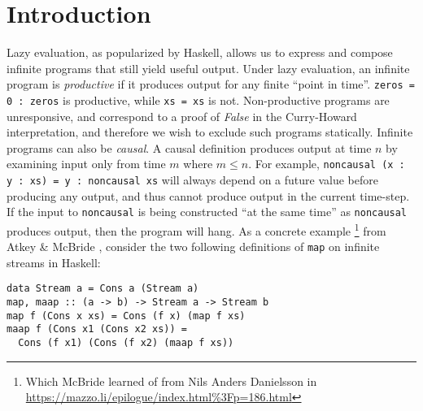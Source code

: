 \documentclass[sigplan,9pt,review]{acmart}\settopmatter{printfolios=true,printccs=false,printacmref=false}
\newcommand{\code}[1]{\texttt{#1}}
\begin{document}


\maketitle


\section{Introduction}
Lazy evaluation, as popularized by Haskell, allows us to express and
compose infinite programs that still yield useful output. Under lazy evaluation, an infinite program is
\emph{productive} if it produces output for any finite ``point in time''. \code{zeros = 0 : zeros} is productive, while \code{xs = xs} is
not. Non-productive programs are unresponsive, and correspond to a proof of \textit{False} in the Curry-Howard
interpretation, and therefore we wish to exclude such programs statically. Infinite programs can
also be \emph{causal}. A causal definition produces output at time $n$ by examining input only
from time $m$ where $m ≤ n$.
For example, \code{noncausal (x : y : xs) = y : noncausal xs}
will always depend on a future value before producing any output, and thus
cannot produce output in the current time-step. If the input to \code{noncausal} is being
constructed ``at the same time'' as \code{noncausal} produces output, then the program will
hang. As a concrete example \footnote{Which McBride learned of from Nils Anders Danielsson
in \url{https://mazzo.li/epilogue/index.html\%3Fp=186.html}}
from Atkey \& McBride \cite{atkey2013productive}, consider the two following
definitions of \code{map} on infinite streams in Haskell:

\begin{verbatim}
data Stream a = Cons a (Stream a)
map, maap :: (a -> b) -> Stream a -> Stream b
map f (Cons x xs) = Cons (f x) (map f xs)
maap f (Cons x1 (Cons x2 xs)) =
  Cons (f x1) (Cons (f x2) (maap f xs))
\end{verbatim}
\end{document}
